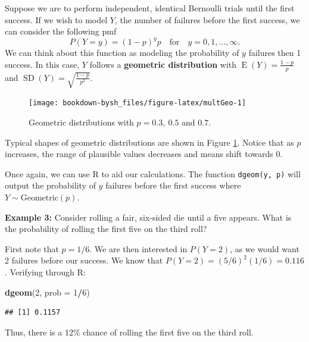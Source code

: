 \documentclass[
]{krantz}
\newenvironment{Shaded}{\begin{snugshade}}{\end{snugshade}}
\newcommand{\DataTypeTok}[1]{\textcolor[rgb]{0.27,0.27,0.27}{#1}}
\newcommand{\DecValTok}[1]{\textcolor[rgb]{0.06,0.06,0.06}{#1}}
\newcommand{\KeywordTok}[1]{\textcolor[rgb]{0.27,0.27,0.27}{\textbf{#1}}}
\newcommand{\NormalTok}[1]{#1}
\newcommand{\OperatorTok}[1]{\textcolor[rgb]{0.43,0.43,0.43}{\textbf{#1}}}
\newcommand{\E}{\operatorname{E}}
\newcommand{\SD}{\operatorname{SD}}
\begin{document}
Suppose we are to perform independent, identical Bernoulli trials until the first success. If we wish to model \(Y\), the number of failures before the first success, we can consider the following pmf
\begin{equation}
P(Y=y) = (1-p)^yp \quad \textrm{for}\quad y = 0, 1, \ldots, \infty.
\label{eq:geomRV}
\end{equation}
We can think about this function as modeling the probability of \(y\) failures then 1 success. In this case, \(Y\) follows a \textbf{geometric distribution} with \(\E(Y) = \frac{1-p}p\) and \(\SD(Y) = \sqrt{\frac{1-p}{p^2}}\).



\begin{figure}

{\centering \texttt{[image: bookdown-bysh\_files/figure-latex/multGeo-1]} 

}

\caption{Geometric distributions with \(p = 0.3,\ 0.5\) and \(0.7\).}\label{fig:multGeo}
\end{figure}

Typical shapes of geometric distributions are shown in Figure \ref{fig:multGeo}. Notice that as \(p\) increases, the range of plausible values decreases and means shift towards 0.

Once again, we can use R to aid our calculations. The function \texttt{dgeom(y,\ p)} will output the probability of \(y\) failures before the first success where \(Y \sim \textrm{Geometric}(p)\).

\textbf{Example 3:} Consider rolling a fair, six-sided die until a five appears. What is the probability of rolling the first five on the third roll?

First note that \(p = 1/6\). We are then interested in \(P(Y=2)\), as we would want 2 failures before our success. We know that \(P(Y=2) = (5/6)^2(1/6) = 0.116\). Verifying through R:

\begin{Shaded}
\begin{Highlighting}[]
\KeywordTok{dgeom}\NormalTok{(}\DecValTok{2}\NormalTok{, }\DataTypeTok{prob =} \DecValTok{1}\OperatorTok{/}\DecValTok{6}\NormalTok{)}
\end{Highlighting}
\end{Shaded}

\begin{verbatim}
## [1] 0.1157
\end{verbatim}

Thus, there is a 12\% chance of rolling the first five on the third roll.
\end{document}
